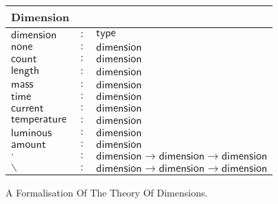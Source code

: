 \begin{figure}[h]
  \begin{center}
    \begin{tabular}{|l c l|}
      \hline
      \textsf{Dimension} & &\\\hline
      $\mathsf{dimension}$ & $:$ & $ \mathsf{type}$\\

      $\mathsf{none}$ & $:$ & $ \mathsf{dimension}$\\
      $\mathsf{count}$ & $:$ & $ \mathsf{dimension}$\\
      $\mathsf{length}$ & $:$ & $ \mathsf{dimension}$\\
      $\mathsf{mass}$ & $:$ & $ \mathsf{dimension}$\\
      $\mathsf{time}$ & $:$ & $ \mathsf{dimension}$\\
      $\mathsf{current}$ & $:$ & $ \mathsf{dimension}$\\
      $\mathsf{temperature}$ & $:$ & $ \mathsf{dimension}$\\
      $\mathsf{luminous}$ & $:$ & $ \mathsf{dimension}$\\
      $\mathsf{amount}$ & $:$ & $ \mathsf{dimension}$\\

      $\cdot{}$ & $:$ & $ \mathsf{dimension} \rightarrow \mathsf{dimension} \rightarrow \mathsf{dimension}$\\
      $\backslash$ & $:$ & $ \mathsf{dimension} \rightarrow \mathsf{dimension} \rightarrow \mathsf{dimension}$\\\hline
    \end{tabular}
  \end{center}
  \caption{A Formalisation Of The Theory Of Dimensions. }
  \label{fig:dimensions}
\end{figure}
